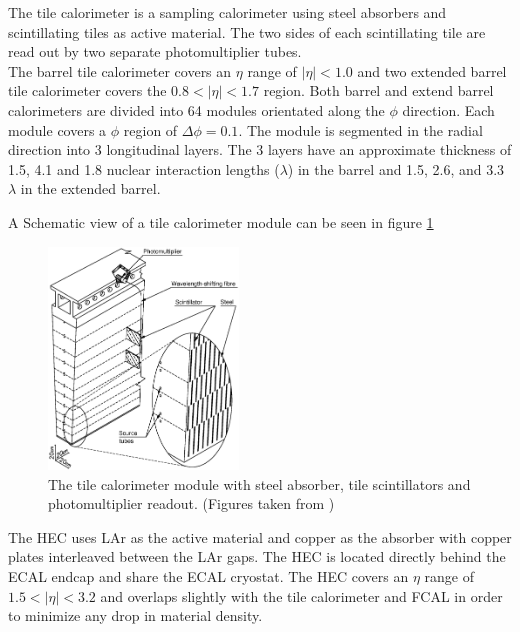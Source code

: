 \indent The tile calorimeter is a sampling calorimeter using steel absorbers and scintillating tiles as active material. The two sides of each scintillating tile are read out by two separate photomultiplier tubes.  \\

\indent The barrel tile calorimeter covers an $\eta$ range of $|\eta| < 1.0$ and two extended barrel tile calorimeter covers the $0.8 < |\eta| < 1.7$ region.  Both barrel and extend barrel calorimeters are divided into 64 modules orientated along the $\phi$ direction.  Each module covers a $\phi$ region of $\Delta\phi = 0.1$.  The module is segmented in the radial direction into 3 longitudinal layers.  The 3 layers have an approximate thickness of 1.5, 4.1 and 1.8 nuclear interaction lengths ($\lambda$) in the barrel and 1.5, 2.6, and 3.3 $\lambda$ in the extended barrel.  

\indent A Schematic view of a tile calorimeter module can be seen in figure \ref{LHC:fig:TileCalo}

\begin{figure}[h!]
\centering
\includegraphics[width=0.45\textwidth, angle=0]{figures/LHC_ATLAS/TileCal_Module3.eps}
\caption{ The tile calorimeter module with steel absorber, tile scintillators and photomultiplier readout.  (Figures taken from \cite{ATLAS_JINST}) \label{LHC:fig:TileCalo}}
\end{figure}


\indent The HEC uses LAr as the active material and copper as the absorber with copper plates interleaved between the LAr gaps.  The HEC is located directly behind the ECAL endcap and share the ECAL cryostat.  The HEC  covers an $\eta$ range of $1.5<|\eta| < 3.2$ and overlaps slightly with the tile calorimeter and FCAL in order to minimize any drop in material density.  \\


